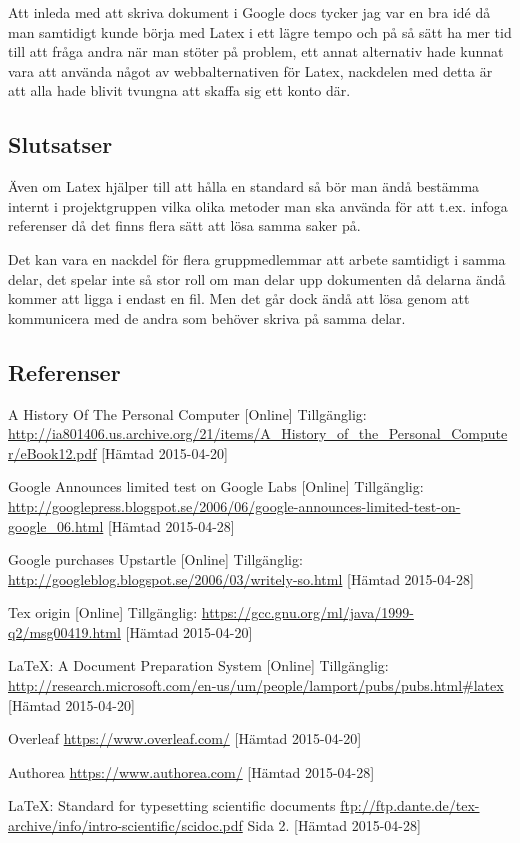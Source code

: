 Att inleda med att skriva dokument i Google docs tycker jag var en bra idé då man samtidigt kunde börja med Latex i ett lägre tempo och på så sätt ha mer tid till att fråga andra när man stöter på problem, ett annat alternativ hade kunnat vara att använda något av webbalternativen för Latex, nackdelen med detta är att alla hade blivit tvungna att skaffa sig ett konto där.

\subsection{Slutsatser}
Även om Latex hjälper till att hålla en standard så bör man ändå bestämma internt i projektgruppen vilka olika metoder man ska använda för att t.ex. infoga referenser då det finns flera sätt att lösa samma saker på.

Det kan vara en nackdel för flera gruppmedlemmar att arbete samtidigt i samma delar, det spelar inte så stor roll om man delar upp dokumenten då delarna ändå kommer att ligga i endast en fil. Men det går dock ändå att lösa genom att kommunicera med de andra som behöver skriva på samma delar.

\subsection{Referenser}
\vspace{-9mm}
\renewcommand{\refname}{}
\begin{thebibliography}{9}
A History Of The Personal Computer [Online] Tillgänglig: 
\url{http://ia801406.us.archive.org/21/items/A_History_of_the_Personal_Computer/eBook12.pdf} [Hämtad 2015-04-20]

Google Announces limited test on Google Labs [Online] Tillgänglig: 
\url{http://googlepress.blogspot.se/2006/06/google-announces-limited-test-on-google_06.html} [Hämtad 2015-04-28]

Google purchases Upstartle [Online] Tillgänglig: 
\url{http://googleblog.blogspot.se/2006/03/writely-so.html} [Hämtad 2015-04-28]

Tex origin [Online] Tillgänglig: 
\url{https://gcc.gnu.org/ml/java/1999-q2/msg00419.html} [Hämtad 2015-04-20]

LaTeX: A Document Preparation System [Online] Tillgänglig: 
\url{http://research.microsoft.com/en-us/um/people/lamport/pubs/pubs.html#latex} [Hämtad 2015-04-20]

Overleaf 
\url{https://www.overleaf.com/} [Hämtad 2015-04-20]

Authorea 
\url{https://www.authorea.com/} [Hämtad 2015-04-28]
 
LaTeX: Standard for typesetting scientific documents
\url{ftp://ftp.dante.de/tex-archive/info/intro-scientific/scidoc.pdf} Sida 2. [Hämtad 2015-04-28]

\end{thebibliography}


